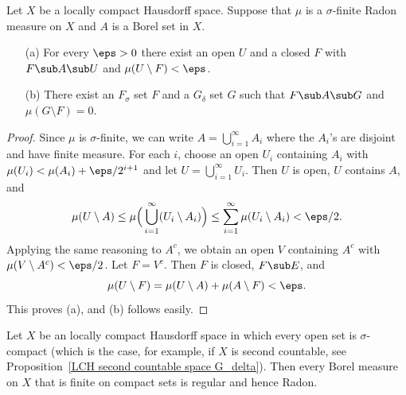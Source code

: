\begin{proposition}\label{sigma-finite Radon regularity}
Let $X$ be a locally compact Hausdorff space. Suppose that $\mu$ is a $\sigma$-finite Radon measure on $X$ and $A$ is a Borel set in $X$.
\begin{itemize}
\item[(a)] For every $\eps>0$ there exist an open $U$ and a closed $F$ with $F\sub A\sub U$ and $\mu(U\setminus F)<\eps$.
\item[(b)] There exist an $F_\sigma$ set $F$ and a $G_\delta$ set $G$ such that $F\sub A\sub G$ and $\mu(G\setminus F)=0$.
\end{itemize}
\end{proposition}
\begin{proof}
Since $\mu$ is $\sigma$-finite, we can write $A=\bigcup_{i=1}^{\infty}A_i$ where the $A_i$'s are disjoint and have finite measure. For each $i$, choose an open $U_i$ containing $A_i$ with $\mu(U_i)<\mu(A_i)+\eps/2^{i+1}$ and let $U=\bigcup_{i=1}^{\infty}U_i$. Then $U$ is open, $U$ contains $A$, and 
\[\mu(U\setminus A)\leq\mu\Big(\bigcup_{i=1}^{\infty}(U_i\setminus A_i)\Big)\leq\sum_{i=1}^{\infty}\mu(U_i\setminus A_i)<\eps/2.\]
Applying the same reasoning to $A^c$, we obtain an open $V$ containing $A^c$ with $\mu(V\setminus A^c)<\eps/2$. Let $F=V^c$. Then $F$ is closed, $F\sub E$, and
\[\mu(U\setminus F)=\mu(U\setminus A)+\mu(A\setminus F)<\eps.\]
This proves (a), and (b) follows easily.
\end{proof}
\begin{proposition}\label{LCH sigma-compact Borel to Radon}
Let $X$ be an locally compact Hausdorff space in which every open set is $\sigma$-compact (which is the case, for example, if $X$ is second countable, see Proposition~\ref{LCH second countable space G_delta}). Then every Borel measure on $X$ that is finite on compact sets is regular and hence Radon.
\end{proposition}
